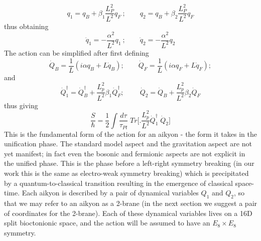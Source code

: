 \documentclass{iopconfser}
\begin{document}
\begin{equation}
 q_1 = q_B + \beta_1 \frac{L_P^2}{L^2} q_F \ ;\qquad 
q_2 = q_B + \beta_2 \frac{L_P^2}{L^2} q_F  
\end{equation}
thus obtaining
\begin{equation}
\ddot q_1 = - \frac{\alpha^2}{L^2} q_1\ ; \qquad 
\ddot q_2 = - \frac{\alpha^2}{L^2} q_2
\end{equation}
The action can be simplified after first defining
\begin{equation}
{\dot{{Q}}_B} = \frac{1}{L} (i\alpha q_B + L \dot{q}_B); \qquad  {\dot{{Q}}_F} = \frac{1}{L} (i\alpha q_F + L \dot{q}_F);
\end{equation}
and
\begin{equation}
\dot{{Q}}_{1} ^\dagger   =   \dot{{Q}}_{B}^\dagger + \frac{L_{p}^{2}}{L^{2}} \beta_{1} \dot{{Q}}_{F}^\dagger  ; \ \qquad \dot {{Q}}_{2} =  \dot{{Q}}_{B} + \frac{L_{p}^{2}}{L^{2}} \beta_{2} \dot{{Q}}_{F}
\end{equation}
thus giving
\begin{equation}
\frac{S}{\hbar} = \frac{1}{2}\int \frac{d\tau}{\tau_{Pl}}\; Tr \biggl[\biggr. \frac{L_{p}^{2}}{L^{2}}  \dot{Q}_{1}^\dagger\;  \dot {Q}_{2} \biggr]
\end{equation}
This is the fundamental form of the action for an aikyon - the form it takes in the unification phase. The standard model aspect and the gravitation aspect are not yet manifest; in fact even the bosonic and fermionic aspects are not explicit in the unified phase. This is the phase before a left-right symmetry breaking (in our work this is the same as electro-weak symmetry breaking) which is precipitated by a quantum-to-classical transition resulting in the emergence of classical space-time. Each aikyon is described by a pair of dynamical variables ${Q}_1$ and $Q_2$, so that we may refer to an aikyon as a 2-brane (in the next section we suggest a pair of coordinates for the 2-brane). Each of these dynamical variables lives on a 16D split bioctonionic space, and the action will be assumed to have an $E_8 \times E_8$ symmetry.
\end{document}
